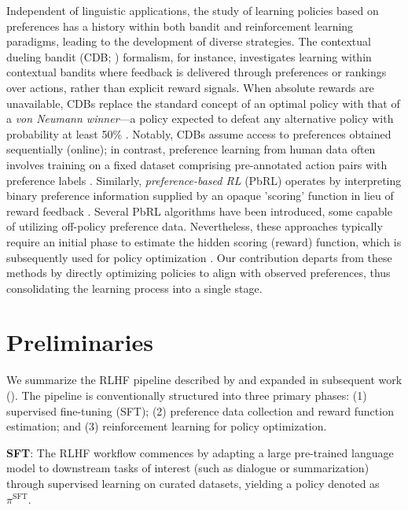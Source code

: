 Independent of linguistic applications, the study of learning policies based on preferences has a history within both bandit and reinforcement learning paradigms, leading to the development of diverse strategies. The contextual dueling bandit (CDB; \cite{yue2012karmed,dudik2015contextual}) formalism, for instance, investigates learning within contextual bandits where feedback is delivered through preferences or rankings over actions, rather than explicit reward signals. When absolute rewards are unavailable, CDBs replace the standard concept of an optimal policy with that of a \textit{von Neumann winner}—a policy expected to defeat any alternative policy with probability at least 50\% \citep{dudik2015contextual}. Notably, CDBs assume access to preferences obtained sequentially (online); in contrast, preference learning from human data often involves training on a fixed dataset comprising pre-annotated action pairs with preference labels \citep{yan2022human}. Similarly, \textit{preference-based RL} (PbRL) operates by interpreting binary preference information supplied by an opaque 'scoring' function in lieu of reward feedback \citep{BusaFekete2014,ruiz2023dueling}. Several PbRL algorithms have been introduced, some capable of utilizing off-policy preference data. Nevertheless, these approaches typically require an initial phase to estimate the hidden scoring (reward) function, which is subsequently used for policy optimization \citep{jain2013learning,BusaFekete2014,christiano2017deep,sadigh2017active,kupcsik2018learning}. Our contribution departs from these methods by directly optimizing policies to align with observed preferences, thus consolidating the learning process into a single stage.

\section{Preliminaries}\label{section:prelims}

We summarize the RLHF pipeline described by \citeauthor{ziegler2020finetuning} and expanded in subsequent work (\citep{stiennon2022learning, bai2022training, ouyang2022training}). The pipeline is conventionally structured into three primary phases: (1) supervised fine-tuning (SFT); (2) preference data collection and reward function estimation; and (3) reinforcement learning for policy optimization.

\textbf{SFT}: The RLHF workflow commences by adapting a large pre-trained language model to downstream tasks of interest (such as dialogue or summarization) through supervised learning on curated datasets, yielding a policy denoted as $\pi^\text{SFT}$.

